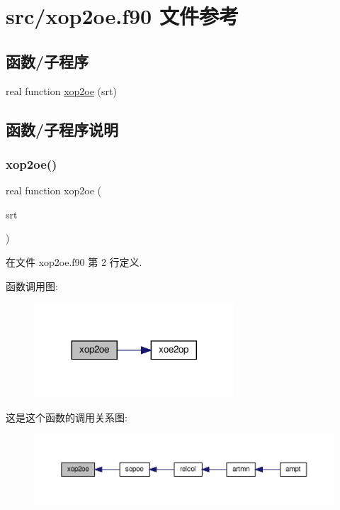 \hypertarget{xop2oe_8f90}{}\section{src/xop2oe.f90 文件参考}
\label{xop2oe_8f90}
\subsection*{函数/子程序}
\begin{DoxyCompactItemize}
\item 
real function \mbox{\hyperlink{xop2oe_8f90_aa5ce9f985576dda43c3f7765ab12351b}{xop2oe}} (srt)
\end{DoxyCompactItemize}


\subsection{函数/子程序说明}
\mbox{\label{xop2oe_8f90_aa5ce9f985576dda43c3f7765ab12351b}} 
\subsubsection{\texorpdfstring{xop2oe()}{xop2oe()}}
{\footnotesize\ttfamily real function xop2oe (\begin{DoxyParamCaption}\item[{}]{srt }\end{DoxyParamCaption})}



在文件 xop2oe.\+f90 第 2 行定义.

函数调用图\+:
\nopagebreak
\begin{figure}[H]
\begin{center}
\leavevmode
\includegraphics[width=212pt]{xop2oe_8f90_aa5ce9f985576dda43c3f7765ab12351b_cgraph}
\end{center}
\end{figure}
这是这个函数的调用关系图\+:
\nopagebreak
\begin{figure}[H]
\begin{center}
\leavevmode
\includegraphics[width=350pt]{xop2oe_8f90_aa5ce9f985576dda43c3f7765ab12351b_icgraph}
\end{center}
\end{figure}

